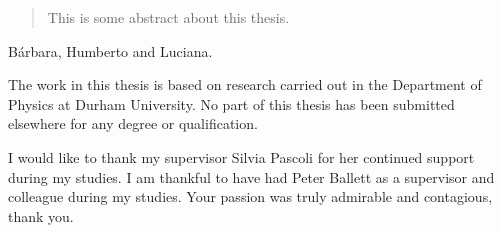 \documentclass[twoside,openright,frontopenright]{ip3thesis}
\begin{document}
\title{}
\subtitle{}
\author{Matheus Hostert}
\maketitlepage*

\begin{abstract}
%
	This is some abstract about this thesis.
%
\end{abstract}


\begin{dedication*}
%
B\'arbara, Humberto and Luciana.
%
\end{dedication*}

\disableprotrusion
\tableofcontents*
\listoffigures
\listoftables
\enableprotrusion

\begin{declaration*}
%
	The work in this thesis is based on research carried out in the Department of
	Physics at Durham University. No part of this thesis has been
	submitted elsewhere for any degree or qualification.
%
\end{declaration*}

\begin{acknowledgements*}
%
	I would like to thank my supervisor Silvia Pascoli for her continued support during my studies. I am thankful to have had Peter Ballett as a supervisor and colleague during my studies. Your passion was truly admirable and contagious, thank you.
	
	
%
\end{acknowledgements*}



\cleardoublepage
\end{document}
